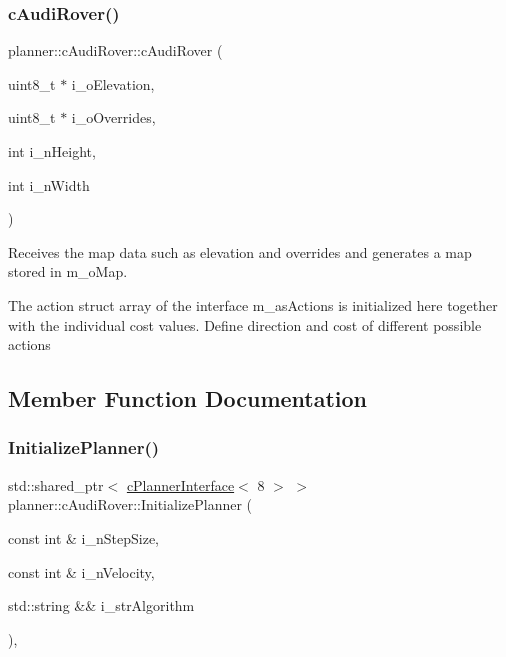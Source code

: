 \subsubsection{\texorpdfstring{c\+Audi\+Rover()}{cAudiRover()}}
{\footnotesize\ttfamily planner\+::c\+Audi\+Rover\+::c\+Audi\+Rover (\begin{DoxyParamCaption}\item[{uint8\+\_\+t $\ast$}]{i\+\_\+o\+Elevation,  }\item[{uint8\+\_\+t $\ast$}]{i\+\_\+o\+Overrides,  }\item[{int}]{i\+\_\+n\+Height,  }\item[{int}]{i\+\_\+n\+Width }\end{DoxyParamCaption})}



Receives the map data such as elevation and overrides and generates a map stored in m\+\_\+o\+Map. 

The action struct array of the interface m\+\_\+as\+Actions is initialized here together with the individual cost values. Define direction and cost of different possible actions 

\subsection{Member Function Documentation}
\mbox{\label{classplanner_1_1c_audi_rover_a892dfcdf781ccdfe95f5af808f5a24ac}} 
\subsubsection{\texorpdfstring{Initialize\+Planner()}{InitializePlanner()}}
{\footnotesize\ttfamily std\+::shared\+\_\+ptr$<$ \mbox{\hyperlink{classplanner_1_1c_planner_interface}{c\+Planner\+Interface}}$<$ 8 $>$ $>$ planner\+::c\+Audi\+Rover\+::\+Initialize\+Planner (\begin{DoxyParamCaption}\item[{const int \&}]{i\+\_\+n\+Step\+Size,  }\item[{const int \&}]{i\+\_\+n\+Velocity,  }\item[{std\+::string \&\&}]{i\+\_\+str\+Algorithm }\end{DoxyParamCaption})\hspace{0.3cm}{\ttfamily [override]}, {\ttfamily [virtual]}}




